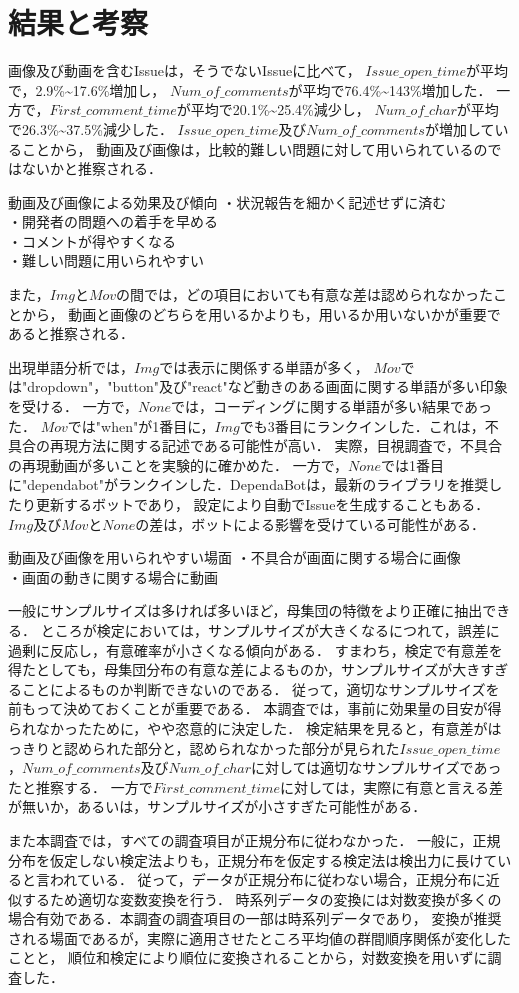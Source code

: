 \section{結果と考察\label{research}}

画像及び動画を含むIssueは，そうでないIssueに比べて，
$Issue\_open\_time$が平均で，2.9\%\textasciitilde17.6\%増加し，
$Num\_of\_comments$が平均で76.4\%\textasciitilde143\%増加した．
一方で，$First\_comment\_time$が平均で20.1\%\textasciitilde25.4\%減少し，
$Num\_of\_char$が平均で26.3\%\textasciitilde 37.5\%減少した．
$Issue\_open\_time$及び$Num\_of\_comments$が増加していることから，
動画及び画像は，比較的難しい問題に対して用いられているのではないかと推察される．

\begin{itembox}{動画及び画像による効果及び傾向}
  ・状況報告を細かく記述せずに済む\\
  ・開発者の問題への着手を早める\\
  ・コメントが得やすくなる\\
  ・難しい問題に用いられやすい
\end{itembox}

また，$Img$と$Mov$の間では，どの項目においても有意な差は認められなかったことから，
動画と画像のどちらを用いるかよりも，用いるか用いないかが重要であると推察される．

出現単語分析では，$Img$では表示に関係する単語が多く，
$Mov$では"dropdown"，"button"及び"react"など動きのある画面に関する単語が多い印象を受ける．
一方で，$None$では，コーディングに関する単語が多い結果であった．
$Mov$では"when"が1番目に，$Img$でも3番目にランクインした．これは，不具合の再現方法に関する記述である可能性が高い．
実際，目視調査で，不具合の再現動画が多いことを実験的に確かめた．
一方で，$None$では1番目に"dependabot"がランクインした．DependaBotは，最新のライブラリを推奨したり更新するボットであり，
設定により自動でIssueを生成することもある．
$Img$及び$Mov$と$None$の差は，ボットによる影響を受けている可能性がある．

\begin{itembox}{動画及び画像を用いられやすい場面}
  ・不具合が画面に関する場合に画像\\
  ・画面の動きに関する場合に動画
\end{itembox}


一般にサンプルサイズは多ければ多いほど，母集団の特徴をより正確に抽出できる．
ところが検定においては，サンプルサイズが大きくなるにつれて，誤差に過剰に反応し，有意確率が小さくなる傾向がある．
すまわち，検定で有意差を得たとしても，母集団分布の有意な差によるものか，サンプルサイズが大きすぎることによるものか判断できないのである．
従って，適切なサンプルサイズを前もって決めておくことが重要である．
本調査では，事前に効果量の目安が得られなかったために，やや恣意的に決定した．
検定結果を見ると，有意差がはっきりと認められた部分と，認められなかった部分が見られた$Issue\_open\_time$，$Num\_of\_comments$及び$Num\_of\_char$に対しては適切なサンプルサイズであったと推察する．
一方で$First\_comment\_time$に対しては，実際に有意と言える差が無いか，あるいは，サンプルサイズが小さすぎた可能性がある．

また本調査では，すべての調査項目が正規分布に従わなかった．
一般に，正規分布を仮定しない検定法よりも，正規分布を仮定する検定法は検出力に長けていると言われている．
従って，データが正規分布に従わない場合，正規分布に近似するため適切な変数変換を行う．
時系列データの変換には対数変換が多くの場合有効である．本調査の調査項目の一部は時系列データであり，
変換が推奨される場面であるが，実際に適用させたところ平均値の群間順序関係が変化したことと，
順位和検定により順位に変換されることから，対数変換を用いずに調査した．